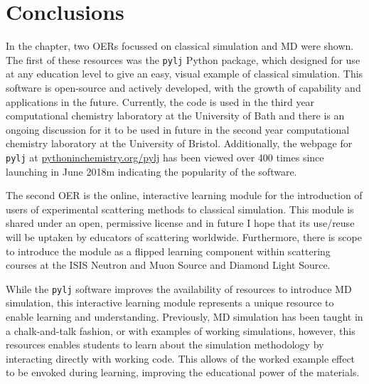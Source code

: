 \section{Conclusions}
In the chapter, two OERs focussed on classical simulation and MD were shown.
The first of these resources was the \texttt{pylj} Python package, which designed for use at any education level to give an easy, visual example of classical simulation.
This software is open-source and actively developed, with the growth of capability and applications in the future.
Currently, the code is used in the third year computational chemistry laboratory at the University of Bath and there is an ongoing discussion for it to be used in future in the second year computational chemistry laboratory at the University of Bristol.
Additionally, the webpage for \texttt{pylj} at \href{https://pythoninchemistry.org/pylj}{pythoninchemistry.org/pylj} has been viewed over 400 times since launching in June 2018m indicating the popularity of the software.

The second OER is the online, interactive learning module for the introduction of users of experimental scattering methods to classical simulation.
This module is shared under an open, permissive license and in future I hope that its use/reuse will be uptaken by educators of scattering worldwide.
Furthermore, there is scope to introduce the module as a flipped learning component\autocite{noauthor_flipped_nodate} within scattering courses at the ISIS Neutron and Muon Source and Diamond Light Source.

While the \texttt{pylj} software improves the availability of resources to introduce MD simulation, this interactive learning module represents a unique resource to enable learning and understanding.
Previously, MD simulation has been taught in a chalk-and-talk fashion, or with examples of working simulations, however, this resources enables students to learn about the simulation methodology by interacting directly with working code.
This allows of the worked example effect to be envoked during learning, improving the educational power of the materials.
